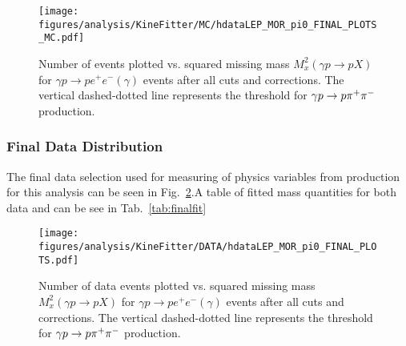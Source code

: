 \begin{figure}[h!]\begin{center}
		\texttt{[image: \\figures/analysis/KineFitter/MC/hdataLEP\_MOR\_pi0\_FINAL\_PLOTS\_MC.pdf]}
		\caption[Number of  events plotted vs. squared missing mass $M^{2}_x(\gamma p \to p X)$ for $\gamma p \to p e^+ e^- (\gamma)$ events after all cuts and corrections.]{\label{fig:kinfit.finalMC.plot}Number of  events plotted vs. squared missing mass $M^{2}_x(\gamma p \to p X)$ for $\gamma p \to p e^+ e^- (\gamma)$ events after all cuts and corrections. The vertical dashed-dotted line represents the threshold for $\gamma p \to p \pi^+\pi^-$ production.}
	\end{center}\end{figure}
\newpage	
\subsubsection{Final Data Distribution}\label{sec.final.data}
The final data selection used for measuring of physics variables from \pizT production for this analysis can be seen in Fig.~\ref{fig:kinfit.final.plot}.A table of fitted mass quantities for both data and  can be see in Tab.~\ref{tab:finalfit}

\begin{figure}[h!]\begin{center}
\texttt{[image: \\figures/analysis/KineFitter/DATA/hdataLEP\_MOR\_pi0\_FINAL\_PLOTS.pdf]}
\caption[Number of data events plotted vs. squared missing mass $M^{2}_x(\gamma p \to p X)$ for $\gamma p \to p e^+ e^- (\gamma)$ events after all cuts and corrections.]{\label{fig:kinfit.final.plot}Number of data events plotted vs. squared missing mass $M^{2}_x(\gamma p \to p X)$ for $\gamma p \to p e^+ e^- (\gamma)$ events after all cuts and corrections. The vertical dashed-dotted line represents the threshold for $\gamma p \to p \pi^+\pi^-$ production.}
\end{center}\end{figure}


\FloatBarrier


\FloatBarrier
